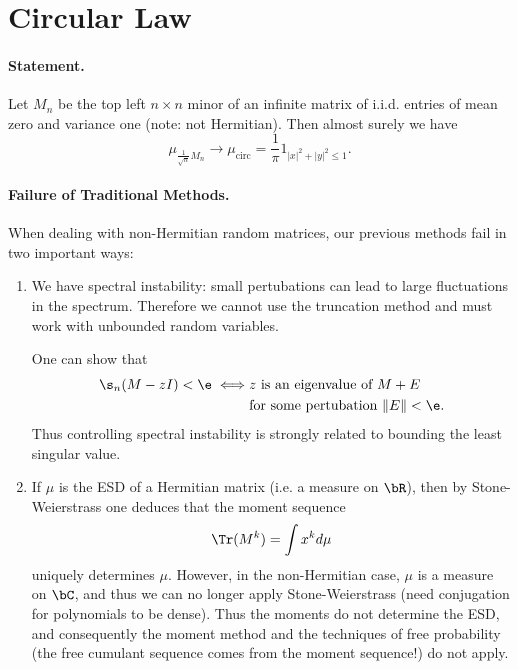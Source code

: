\section*{Circular Law}

\paragraph{Statement.} Let $M_n$ be the top left $n \times n$ minor of an infinite matrix of i.i.d. entries of mean zero and variance one (note: not Hermitian). Then almost surely we have
\[
    \mu_{\frac{1}{\sqrt{n}}M_n} \to \mu_{\text{circ}} = \frac{1}{\pi}1_{|x|^2+|y|^2 \le 1}.
\]

\paragraph{Failure of Traditional Methods.} When dealing with non-Hermitian random matrices, our previous methods fail in two important ways:
\begin{enumerate}
    \item We have spectral instability: small pertubations can lead to large fluctuations in the spectrum. Therefore we cannot use the truncation method and must work with unbounded random variables.

    One can show that
    \[
        \begin{split}
            \s_n(M-zI) < \e \iff & z \text{ is an eigenvalue of $M + E$} \\
                                 & \text{for some pertubation } \|E\| < \e.
        \end{split}
    \]
    Thus controlling spectral instability is strongly related to bounding the least singular value.
    \item If $\mu$ is the ESD of a Hermitian matrix (i.e. a measure on $\bR$), then by Stone-Weierstrass one deduces that the moment sequence
    \[
        \Tr(M^k) = \int x^k d\mu
    \]
    uniquely determines $\mu$. However, in the non-Hermitian case, $\mu$ is a measure on $\bC$, and thus we can no longer apply Stone-Weierstrass (need conjugation for polynomials to be dense). Thus the moments do not determine the ESD, and consequently the moment method and the techniques of free probability (the free cumulant sequence comes from the moment sequence!) do not apply.
\end{enumerate}

